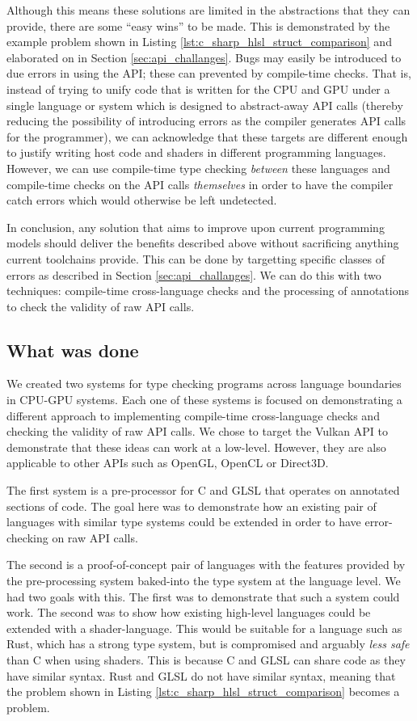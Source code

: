 \documentclass[a4paper,12pt,twoside,openright]{report}
\begin{document}
Although this means these solutions are limited in the abstractions that they
can provide, there are some ``easy wins'' to be made. This is demonstrated by
the example problem shown in Listing \ref{lst:c_sharp_hlsl_struct_comparison}
and elaborated on in Section \ref{sec:api_challanges}. Bugs may easily be
introduced to due errors in using the API; these can prevented by compile-time
checks. That is, instead of trying to unify code that is written for the CPU
and GPU under a single language or system which is designed to abstract-away
API calls (thereby reducing the possibility of introducing errors as the
compiler generates API calls for the programmer), we can acknowledge that these
targets are different enough to justify writing host code and shaders in
different programming languages. However, we can use compile-time type checking
\textit{between} these languages and compile-time checks on the API calls
\textit{themselves} in order to have the compiler catch errors which would
otherwise be left undetected.

In conclusion, any solution that aims to improve upon current programming
models should deliver the benefits described above without sacrificing anything
current toolchains provide. This can be done by targetting specific classes of
errors as described in Section \ref{sec:api_challanges}. We can do this with
two techniques: compile-time cross-language checks and the processing of
annotations to check the validity of raw API calls.

\subsection{What was done}

We created two systems for type checking programs across language boundaries in
CPU-GPU systems. Each one of these systems is focused on demonstrating a
different approach to implementing compile-time cross-language checks and
checking the validity of raw API calls. We chose to target the Vulkan API to
demonstrate that these ideas can work at a low-level. However, they are also
applicable to other APIs such as OpenGL, OpenCL or Direct3D.

The first system is a pre-processor for C and GLSL that operates on annotated
sections of code. The goal here was to demonstrate how an existing pair of
languages with similar type systems could be extended in order to have
error-checking on raw API calls.

The second is a proof-of-concept pair of languages with the features provided
by the pre-processing system baked-into the type system at the language level.
We had two goals with this. The first was to demonstrate that such a system
could work. The second was to show how existing high-level languages could be
extended with a shader-language. This would be suitable for a language such as
Rust, which has a strong type system, but is compromised and arguably
\textit{less safe} than C when using shaders. This is because C and GLSL can
share code as they have similar syntax. Rust and GLSL do not have similar
syntax, meaning that the problem shown in Listing
\ref{lst:c_sharp_hlsl_struct_comparison} becomes a problem.
\end{document}
